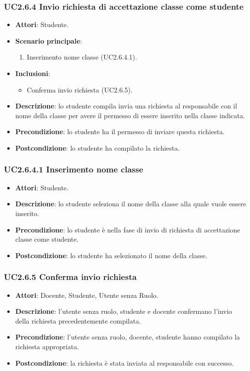 \subsubsection{UC2.6.4 Invio richiesta di accettazione classe come studente}
\begin{itemize}
\item \textbf{Attori}: Studente.
\item \textbf{Scenario principale}:
\begin{enumerate}
\item Inserimento nome classe (UC2.6.4.1).
\end{enumerate}
\item \textbf{Inclusioni}:
\begin{itemize}
\item Conferma invio richiesta (UC2.6.5).
\end{itemize}
\item \textbf{Descrizione}: lo studente compila invia una richiesta al responsabile con il nome della classe per avere il permesso di essere inserito nella classe indicata.
\item \textbf{Precondizione}: lo studente ha il permesso di inviare questa richiesta.
\item \textbf{Postcondizione}: lo studente ha compilato la richiesta.
\end{itemize}
\subsubsection{UC2.6.4.1 Inserimento nome classe}
\begin{itemize}
\item \textbf{Attori}: Studente.
\item \textbf{Descrizione}: lo studente seleziona il nome della classe alla quale vuole essere inserito.
\item \textbf{Precondizione}: lo studente è nella fase di invio di richiesta di accettazione classe come studente.
\item \textbf{Postcondizione}: lo studente ha selezionato il nome della classe.
\end{itemize}
\subsubsection{UC2.6.5 Conferma invio richiesta}
\begin{itemize}
\item \textbf{Attori}: Docente, Studente, Utente senza Ruolo.
\item \textbf{Descrizione}: l'utente senza ruolo, studente e docente confermano l'invio della richiesta  precedentemente compilata.
\item \textbf{Precondizione}: l'utente senza ruolo, docente, studente hanno compilato la richiesta appropriata.
\item \textbf{Postcondizione}: la richiesta è stata inviata al responsabile con successo.
\end{itemize}
